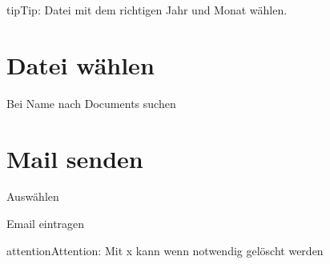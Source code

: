 \documentclass[letterpaper,10pt,english]{sphinxmanual}
\begin{document}
\begin{sphinxVerbatim}[commandchars=\\\{\}]
    
\end{sphinxVerbatim}

\begin{sphinxadmonition}{tip}{Tip:}
\sphinxAtStartPar
Datei mit dem richtigen Jahr und Monat wählen.
\end{sphinxadmonition}

\sphinxstepscope


\chapter{Datei wählen}
\label{\detokenize{intro_04:datei-wahlen}}\label{\detokenize{intro_04::doc}}
\sphinxAtStartPar
Bei Name nach Documents  suchen

\begin{sphinxVerbatim}[commandchars=\\\{\}]
  
\end{sphinxVerbatim}

\sphinxstepscope


\chapter{Mail senden}
\label{\detokenize{intro_05:mail-senden}}\label{\detokenize{intro_05::doc}}
\sphinxAtStartPar
Auswählen

\begin{sphinxVerbatim}[commandchars=\\\{\}]
   
  
\end{sphinxVerbatim}

\sphinxAtStartPar
Email eintragen

\begin{sphinxVerbatim}[commandchars=\\\{\}]
\end{sphinxVerbatim}

\begin{sphinxadmonition}{attention}{Attention:}
\sphinxAtStartPar
Mit x kann wenn notwendig gelöscht werden
\end{sphinxadmonition}
\end{document}
